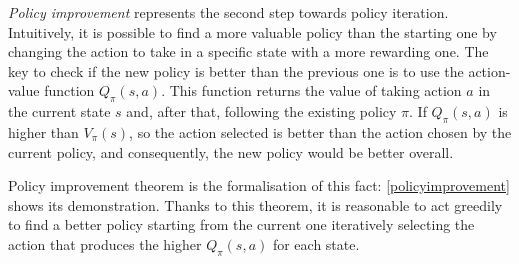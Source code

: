 \textit{Policy improvement} represents the second step towards policy iteration. Intuitively, it is possible to find a more valuable policy than the starting one by changing the action to take in a specific state with a more rewarding one.  The key to check if the new policy is better than the previous one is to use the action-value function $Q_\pi(s,a)$. This function returns the value of taking action $a$ in the current state $s$ and, after that, following the existing policy $\pi$. If $Q_\pi(s,a)$ is higher than $V_\pi(s)$, so the action selected is better than the action chosen by the current policy, and consequently, the new policy would be better overall.

Policy improvement theorem is the formalisation of this fact: \vref{policyimprovement} shows its demonstration. Thanks to this theorem, it is reasonable to act greedily to find a better policy starting from the current one iteratively selecting the action that produces the higher  $Q_\pi(s, a)$ for each state.


